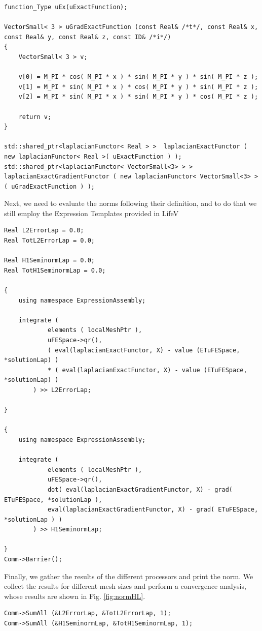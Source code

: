 \begin{itemize}
\begin{lstlisting}
function_Type uEx(uExactFunction);

VectorSmall< 3 > uGradExactFunction (const Real& /*t*/, const Real& x, const Real& y, const Real& z, const ID& /*i*/)
{
    VectorSmall< 3 > v;
    
    v[0] = M_PI * cos( M_PI * x ) * sin( M_PI * y ) * sin( M_PI * z );
    v[1] = M_PI * sin( M_PI * x ) * cos( M_PI * y ) * sin( M_PI * z );
    v[2] = M_PI * sin( M_PI * x ) * sin( M_PI * y ) * cos( M_PI * z );
    
    return v;
}

std::shared_ptr<laplacianFunctor< Real > >  laplacianExactFunctor ( new laplacianFunctor< Real >( uExactFunction ) );
std::shared_ptr<laplacianFunctor< VectorSmall<3> > >  laplacianExactGradientFunctor ( new laplacianFunctor< VectorSmall<3> >( uGradExactFunction ) );
\end{lstlisting}
Next, we need to evaluate the norms following their definition, and to do that we still employ the Expression Templates provided in LifeV
\begin{lstlisting}
Real L2ErrorLap = 0.0;
Real TotL2ErrorLap = 0.0;

Real H1SeminormLap = 0.0;
Real TotH1SeminormLap = 0.0;

{
    using namespace ExpressionAssembly;

    integrate (
            elements ( localMeshPtr ),
            uFESpace->qr(),
            ( eval(laplacianExactFunctor, X) - value (ETuFESpace, *solutionLap) )
            * ( eval(laplacianExactFunctor, X) - value (ETuFESpace, *solutionLap) )
        ) >> L2ErrorLap;

}

{
    using namespace ExpressionAssembly;
    
    integrate (
            elements ( localMeshPtr ),
            uFESpace->qr(),
            dot( eval(laplacianExactGradientFunctor, X) - grad( ETuFESpace, *solutionLap ),
            eval(laplacianExactGradientFunctor, X) - grad( ETuFESpace, *solutionLap ) )
        ) >> H1SeminormLap;
 
}
Comm->Barrier();
\end{lstlisting}
Finally, we gather the results of the different processors and print the norm. We collect the results for different mesh sizes and perform a convergence analysis, whose results are shown in Fig. \ref{fig:normHL}.
\begin{lstlisting}
Comm->SumAll (&L2ErrorLap, &TotL2ErrorLap, 1);
Comm->SumAll (&H1SeminormLap, &TotH1SeminormLap, 1);


\end{lstlisting}
\end{itemize}

